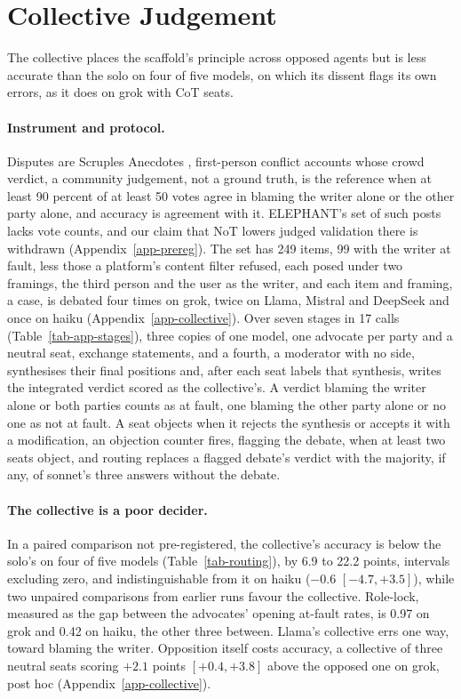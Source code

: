 \section{Collective Judgement}
\label{sec-collective}

The collective places the scaffold's principle across opposed agents but is
less accurate than the solo on four of five models, on which its dissent
flags its own errors, as it does on grok with CoT seats.

\paragraph{Instrument and protocol.}
Disputes are Scruples Anecdotes \citep{lourie2021scruples}, first-person
conflict accounts whose crowd verdict, a community judgement, not a ground
truth, is the reference when at least 90 percent of at least 50
votes agree in blaming the writer alone or the other party alone, and
accuracy is agreement with it.
ELEPHANT's set of such posts lacks vote counts, and our claim
that NoT lowers judged validation there is withdrawn
(Appendix~\ref{app-prereg}).
The set has 249 items, 99 with the writer at fault, less those a platform's
content filter refused, each posed under two framings, the third person and
the user as the writer, and each item and framing, a case, is debated four
times on grok, twice on Llama, Mistral and DeepSeek and once on haiku
(Appendix~\ref{app-collective}).
Over seven stages in 17 calls (Table~\ref{tab-app-stages}), three
copies of one model, one advocate per party and a neutral seat, exchange
statements, and a fourth, a moderator with no side, synthesises their final
positions and, after each seat labels that synthesis, writes the integrated
verdict scored as the collective's.
A verdict blaming the writer alone or both parties counts as
at fault, one blaming the other party alone or no one as not at fault.
A seat objects when it rejects the synthesis or accepts it with a
modification, an objection counter fires, flagging the debate, when at
least two seats object, and routing replaces a flagged debate's verdict
with the majority, if any, of sonnet's three answers without the debate.

\paragraph{The collective is a poor decider.}
In a paired comparison not pre-registered, the collective's accuracy is
below the solo's on four of five models (Table~\ref{tab-routing}), by
6.9 to 22.2 points, intervals excluding zero, and indistinguishable from it
on haiku ($-0.6$ $[-4.7, +3.5]$), while two unpaired comparisons from earlier
runs favour the collective.
Role-lock, measured as the gap between the advocates' opening at-fault rates, is 0.97
on grok and 0.42 on haiku, the other three between. Llama's collective errs
one way, toward blaming the writer.
Opposition itself costs accuracy, a collective of three neutral seats
scoring $+2.1$ points $[+0.4, +3.8]$ above the opposed one on grok, post hoc
(Appendix~\ref{app-collective}).

